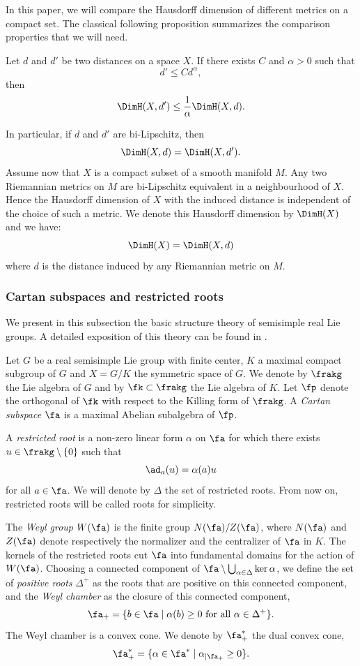 In this paper, we will compare the Hausdorff dimension of different metrics on a compact set. The classical following proposition summarizes the comparison properties that we will need.
\begin{prop} \label{p:GeneralComparisonHDim}
Let $d$ and $d'$ be two distances on a space $X$. If there exists $C$ and $\alpha>0$ such that
\[d' \leq C d^{\alpha},\]
then
\[\DimH(X,d') \leq \frac{1}{\alpha} \DimH(X,d).\]
\end{prop}

In particular, if $d$ and $d'$ are bi-Lipschitz, then \[\DimH(X,d) = \DimH(X,d').\]
Assume now that $X$ is a compact subset of a smooth manifold $M$. Any two Riemannian metrics on $M$ are bi-Lipschitz equivalent in a neighbourhood of $X$. Hence the Hausdorff dimension of $X$ with the induced distance is independent of the choice of such a metric. We denote this Hausdorff dimension by $\DimH(X)$ and we have:
\[\DimH(X)= \DimH(X,d)\]
where $d$ is the distance induced by any Riemannian metric on $M$.

 \label{subsec - lie theory}

\subsubsection{Cartan subspaces and restricted roots}
We present in this subsection the basic structure theory of semisimple real Lie groups. A detailed exposition of this theory can be found in \cite{eberlein1996geometry}.

Let $G$ be a real semisimple Lie group with finite center, $K$ a maximal compact subgroup of $G$ and $X=G/K$ the symmetric space of $G$. We denote by $\frakg$ the Lie algebra of $G$ and by $\fk\subset \frakg$ the Lie algebra of $K$. Let $\fp$ denote the orthogonal of $\fk$ with respect to the Killing form of $\frakg$. A \emph{Cartan subspace} $\fa$ is a maximal Abelian subalgebra of $\fp$.

A \emph{restricted root} is a non-zero linear form $\alpha$ on $\fa$ for which there exists $u\in \frakg \setminus \{0\}$ such that
\[\ad_a(u) = \alpha(a) u\]
for all $a\in \fa$. We will denote by $\Delta$ the set of restricted roots. From now on, restricted roots will be called roots for simplicity.

The \emph{Weyl group} $W(\fa)$ is the finite group $N(\fa)/Z(\fa)$, where $N(\fa)$ and $Z(\fa)$ denote respectively the normalizer and the centralizer of $\fa$ in $K$. The kernels of the restricted roots cut $\fa$ into fundamental domains for the action of $W(\fa)$. Choosing a connected component of $\fa \setminus \bigcup_{\alpha \in \Delta} \ker \alpha$, we define the set of \emph{positive roots} $\Delta^+$ as the roots that are positive on this connected component, and the \emph{Weyl chamber} as the closure of this connected component, \ie
\[\fa_+ = \{b\in \fa \mid \alpha(b) \geq 0 \textrm{ for all $\alpha\in \Delta^+$}\}.\]
The Weyl chamber is a convex cone. We denote by $\fa_+^*$ the dual convex cone, \ie
\[\fa_+^* = \{\alpha \in \fa^* \mid \alpha_{\vert \fa_+} \geq 0\}.\]

